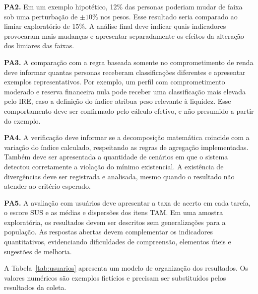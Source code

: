 \documentclass[portuguese]{sbc2025}%
\begin{document}
\textbf{PA2.}
Em um exemplo hipotético, 12\% das personas poderiam mudar de faixa
sob uma perturbação de $\pm 10\%$ nos pesos. Esse resultado seria
comparado ao limiar exploratório de 15\%. A análise final deve indicar
quais indicadores provocaram mais mudanças e apresentar separadamente
os efeitos da alteração dos limiares das faixas.

\textbf{PA3.}
A comparação com a regra baseada somente no comprometimento de renda
deve informar quantas personas receberam classificações diferentes
e apresentar exemplos representativos. Por exemplo, um perfil com
comprometimento moderado e reserva financeira nula pode receber uma
classificação mais elevada pelo IRE, caso a definição do índice
atribua peso relevante à liquidez. Esse comportamento deve ser
confirmado pelo cálculo efetivo, e não presumido a partir do exemplo.

\textbf{PA4.}
A verificação deve informar se a decomposição matemática coincide
com a variação do índice calculado, respeitando as regras de agregação
implementadas. Também deve ser apresentada a quantidade de cenários
em que o sistema detectou corretamente a violação do mínimo
existencial. A existência de divergências deve ser registrada e
analisada, mesmo quando o resultado não atender ao critério esperado.

\textbf{PA5.}
A avaliação com usuários deve apresentar a taxa de acerto em cada
tarefa, o escore SUS e as médias e dispersões dos itens TAM. Em uma
amostra exploratória, os resultados devem ser descritos sem
generalizações para a população. As respostas abertas devem
complementar os indicadores quantitativos, evidenciando dificuldades
de compreensão, elementos úteis e sugestões de melhoria.

A Tabela~\ref{tab:usuarios} apresenta um modelo de organização dos
resultados. Os valores numéricos são exemplos fictícios e precisam
ser substituídos pelos resultados da coleta.
\end{document}
